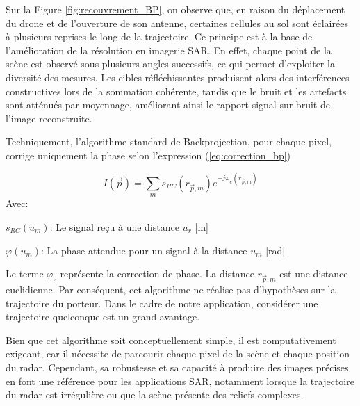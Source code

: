 Sur la Figure \ref{fig:recouvrement_BP}, on observe que, en raison du déplacement du drone et de l'ouverture de son antenne, certaines cellules au sol sont éclairées à plusieurs reprises le long de la trajectoire. Ce principe est à la base de l'amélioration de la résolution en imagerie SAR. En effet, chaque point de la scène est observé sous plusieurs angles successifs, ce qui permet d'exploiter la diversité des mesures. Les cibles réfléchissantes produisent alors des interférences constructives lors de la sommation cohérente, tandis que le bruit et les artefacts sont atténués par moyennage, améliorant ainsi le rapport signal-sur-bruit de l'image reconstruite. 

Techniquement, l'algorithme standard de Backprojection, pour chaque pixel, corrige uniquement la phase selon l'expression (\ref{eq:correction_bp})

\begin{equation}
    \label{eq:correction_bp}
    I(\Vec{p})=\sum_m s_{RC}(r_{\Vec{p}, m})e^{-j\varphi_{e}(r_{\Vec{p}, m})}
\end{equation}
Avec: 
\begin{description}
    \item{$s_{RC}(u_{m})$: Le signal reçu à une distance $u_{r}$ [m]}
    \item{$\varphi(u_{m})$: La phase attendue pour un signal à la distance $u_m$ [rad]}
\end{description}
Le terme $\varphi_e$ représente la correction de phase. 
La distance $r_{\Vec{p}, m}$ est une distance euclidienne. Par conséquent, cet algorithme ne réalise pas d'hypothèses sur la trajectoire du porteur. Dans le cadre de notre application, considérer une trajectoire quelconque est un grand avantage. 

Bien que cet algorithme soit conceptuellement simple, il est computativement exigeant, car il nécessite de parcourir chaque pixel de la scène et chaque position du radar. Cependant, sa robustesse et sa capacité à produire des images précises en font une référence pour les applications SAR, notamment lorsque la trajectoire du radar est irrégulière ou que la scène présente des reliefs complexes.
